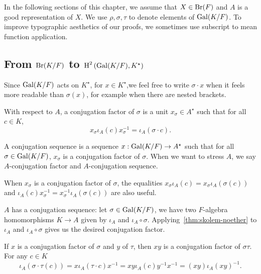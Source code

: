 In the following sections of this chapter, we assume that $X \in\operatorname{Br}(F)$ and $A$ is a good representation of $X$. We use $\rho, \sigma, \tau$ to denote elements of $\operatorname{Gal}(K/F)$. To improve typographic aesthetics of our proofs, we sometimes use subscript to mean function application.


\subsection{From $\operatorname{Br}(K/F)$ to $\operatorname{H}^{2}\left(\operatorname{Gal}(K/F),K^{\star}\right)$}

\begin{remark}
  Since $\operatorname{Gal}(K/F)$ acts on $K^{\star}$, for $x\in K^{\star}$,we feel free to write $\sigma\cdot x$ when it feels more readable than $\sigma(x)$, for example when there are nested brackets.
\end{remark}


\begin{definition}
  \label{def:conj-factor}
  With respect to $A$, a conjugation factor of $\sigma$ is a unit $x_{\sigma} \in A^{\star}$ such that for all $c \in K$,
  \[
    x_{\sigma} \iota_{A}(c)x_{\sigma}^{-1} = \iota_{A}(\sigma \cdot c).
  \]

  A conjugation sequence is a sequence $x:\operatorname{Gal}(K/F) \to A^{\star}$ such that for all $\sigma\in\operatorname{Gal}(K/F)$, $x_{\sigma}$ is a conjugation factor of $\sigma$. When we want to stress $A$, we say $A$-conjugation factor and $A$-conjugation sequence.
  \leanok
\end{definition}

\begin{remark}\label{rem:conj-factor-alternative-eq}
  When $x_{\sigma}$ is a conjugation factor of $\sigma$, the equalities $x_{\sigma}\iota_{A}(c) = x_{\sigma}\iota_{A}(\sigma(c))$ and $\iota_{A}(c)x_{\sigma}^{-1}=x_{\sigma}^{-1}\iota_{A}(\sigma(c))$ are also useful.
\end{remark}

\begin{construction}\label{con:exists-conj-seq}
  $A$ has a conjugation sequence:
  let $\sigma \in \operatorname{Gal}(K/F)$, we have two $F$-algebra homomorphisms $K \to A$ given by $\iota_{A}$ and $\iota_{A}\circ \sigma$. Applying~\cref{thm:skolem-noether} to $\iota_{A}$ and $\iota_{A}\circ \sigma$ gives us the desired conjugation factor.
  \leanok
\end{construction}

\begin{construction}
  If $x$ is a conjugation factor of $\sigma$ and $y$ of $\tau$, then $xy$ is a conjugation factor of $\sigma\tau$. For any $c \in K$
  \[
    \iota_{A}(\sigma \cdot\tau(c)) = x\iota_{A}(\tau\cdot c)x^{-1} = xy\iota_{A}(c)y^{-1}x^{-1}=\left(xy\right)\iota_{A}{\left(xy\right)}^{-1}.
  \]
  \leanok
\end{construction}

